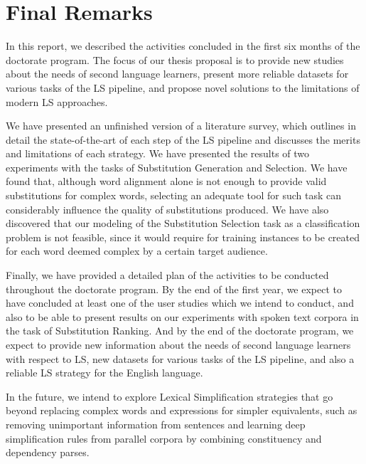 \chapter{Final Remarks}
\label{finalremarks}

In this report, we described the activities concluded in the first six months of the doctorate program. The focus of our thesis proposal is to provide new studies about the needs of second language learners, present more reliable datasets for various tasks of the LS pipeline, and propose novel solutions to the limitations of modern LS approaches.

We have presented an unfinished version of a literature survey, which outlines in detail the state-of-the-art of each step of the LS pipeline and discusses the merits and limitations of each strategy. We have presented the results of two experiments with the tasks of Substitution Generation and Selection. We have found that, although word alignment alone is not enough to provide valid substitutions for complex words, selecting an adequate tool for such task can considerably influence the quality of substitutions produced. We have also discovered that our modeling of the Substitution Selection task as a classification problem is not feasible, since it would require for training instances to be created for each word deemed complex by a certain target audience.

Finally, we have provided a detailed plan of the activities to be conducted throughout the doctorate program. By the end of the first year, we expect to have concluded at least one of the user studies which we intend to conduct, and also to be able to present results on our experiments with spoken text corpora in the task of Substitution Ranking. And by the end of the doctorate program, we expect to provide new information about the needs of second language learners with respect to LS, new datasets for various tasks of the LS pipeline, and also a reliable LS strategy for the English language.

In the future, we intend to explore Lexical Simplification strategies that go beyond replacing complex words and expressions for simpler equivalents, such as removing unimportant information from sentences and learning deep simplification rules from parallel corpora by combining constituency and dependency parses.